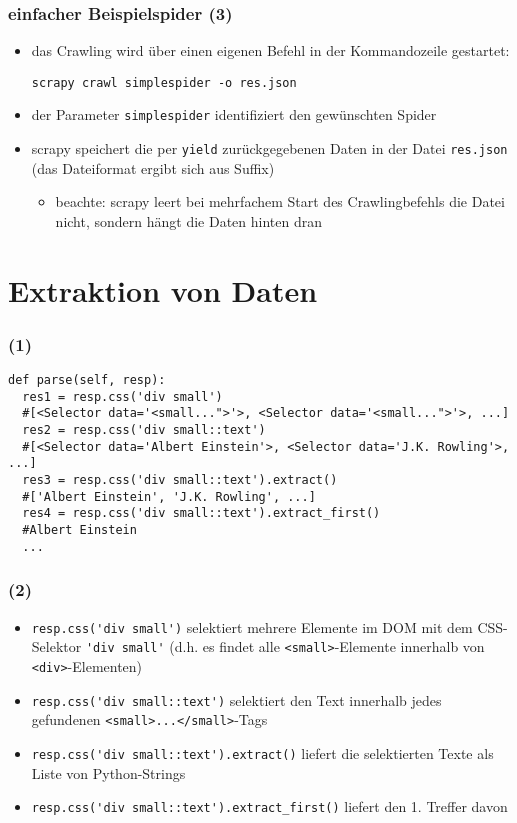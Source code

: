 \documentclass{beamer}
\begin{document}
\begin{frame}[fragile]
	\frametitle{einfacher Beispielspider (3)}
	\begin{itemize}
		\item das Crawling wird über einen eigenen Befehl in der Kommandozeile gestartet:
			\begin{lstlisting}
scrapy crawl simplespider -o res.json
			\end{lstlisting}
		\item der Parameter \lstinline|simplespider| identifiziert den gewünschten Spider
		\item scrapy speichert die per \lstinline|yield| zurückgegebenen Daten in der Datei \lstinline|res.json| (das Dateiformat ergibt sich aus Suffix) \begin{itemize}
			\item beachte: scrapy leert bei mehrfachem Start des Crawlingbefehls die Datei nicht, sondern hängt die Daten hinten dran
		\end{itemize}
	\end{itemize}
\end{frame}

\section{Extraktion von Daten}
\begin{frame}[fragile]
	\frametitle{\insertsection{} (1)}
	\begin{lstlisting}[breaklines=true]
def parse(self, resp):
  res1 = resp.css('div small')
  #[<Selector data='<small...">'>, <Selector data='<small...">'>, ...]
  res2 = resp.css('div small::text')
  #[<Selector data='Albert Einstein'>, <Selector data='J.K. Rowling'>, ...]
  res3 = resp.css('div small::text').extract()
  #['Albert Einstein', 'J.K. Rowling', ...]
  res4 = resp.css('div small::text').extract_first()
  #Albert Einstein
  ...
	\end{lstlisting}
\end{frame}

\begin{frame}[fragile]
	\frametitle{\insertsection{} (2)}
	\begin{itemize}
		\item \lstinline|resp.css('div small')| selektiert mehrere Elemente im DOM mit dem CSS-Selektor \lstinline|'div small'| (d.h. es findet alle \lstinline|<small>|-Elemente innerhalb von \lstinline|<div>|-Elementen)
		\item \lstinline|resp.css('div small::text')| selektiert den Text innerhalb jedes gefundenen \lstinline|<small>...</small>|-Tags
		\item \lstinline|resp.css('div small::text').extract()| liefert die selektierten Texte als Liste von Python-Strings
		\item \lstinline|resp.css('div small::text').extract_first()| liefert den 1. Treffer davon
	\end{itemize}
\end{frame}
\end{document}
